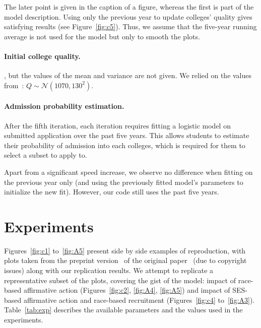 The later point is given in the caption of a figure, whereas the first is part of the model description.
Using only the previous year to update colleges' quality gives satisfying results (see Figure~\ref{fig:c5}).
Thus, we assume that the five-year running average is not used for the model but only to smooth the plots.

\paragraph{Initial college quality.}

, but the values of the mean and variance are not given.
We relied on the values from~\cite{reardon2016agent}: $Q \sim \mathcal{N}(1070, 130^2)$.

\paragraph{Admission probability estimation.}

After the fifth iteration, each iteration requires fitting a logistic model on submitted application over the past five years. This allows students to estimate their probability of admission into each colleges, which is required for them to select a subset to apply to.

Apart from a significant speed increase, we observe no difference when fitting on the previous year only (and using the previously fitted model's parameters to initialize the new fit).
However, our code still uses the past five years.

\section{Experiments}

Figures~\ref{fig:c1} to~\ref{fig:A5} present side by side examples of reproduction, with plots taken from the preprint version~\cite{reardon2018levels_preprint} of the original paper~\cite{reardon2018levels} (due to copyright issues) along with our replication results. %
We attempt to replicate a representative subset of the plots, covering the gist of the model: impact of race-based affirmative action (Figures~\ref{fig:c2}, \ref{fig:A4}, \ref{fig:A5}) and impact of SES-based affirmative action and race-based recruitment (Figures~\ref{fig:c4} to~\ref{fig:A3}). %
Table~\ref{tab:exp} describes the available parameters and the values used in the experiments.

